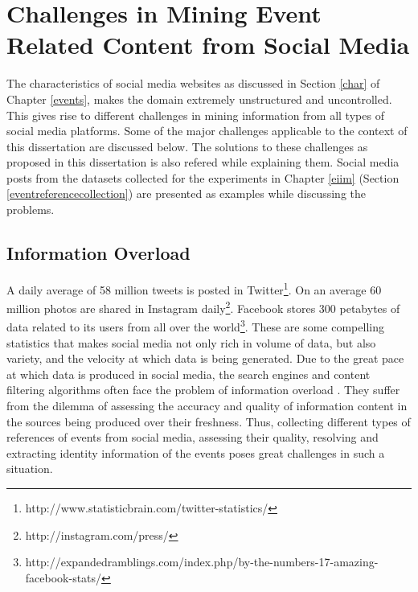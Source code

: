 
\chapter{Challenges in Mining Event Related Content from Social Media} %

\label{challenges} %

\doublespacing
\setlength{\parindent}{1cm}
The characteristics of social media websites as discussed in Section \ref{char} of Chapter \ref{events}, makes the domain extremely unstructured and uncontrolled. This gives rise to different challenges in mining information from all types of social media platforms. Some of the major challenges applicable to the context of this dissertation are discussed below. The solutions to these challenges as proposed in this dissertation is also refered while explaining them. Social media posts from the datasets collected for the experiments in Chapter \ref{eiim} (Section \ref{eventreferencecollection}) are presented as examples while discussing the problems.

\section{Information Overload\label{informationoverload}}
A daily average of 58 million tweets is posted in Twitter\footnote{http://www.statisticbrain.com/twitter-statistics/}. On an average 60 million  photos are shared in Instagram daily\footnote{http://instagram.com/press/}. Facebook stores 300 petabytes  of data related to its users from all over the world\footnote{http://expandedramblings.com/index.php/by-the-numbers-17-amazing-facebook-stats/}. These are some compelling statistics that makes social media not only rich in volume of data, but also variety, and the velocity at which data is being generated. Due to the great pace at which data is produced in social media, the search engines and content filtering algorithms often face the problem of information overload \cite{hemp2009death}. They suffer from the dilemma of assessing the accuracy and quality of information content in the sources being produced over their freshness. Thus, collecting different types of references of events from social media, assessing their quality, resolving and extracting identity information of the events poses great challenges in such a situation. 

